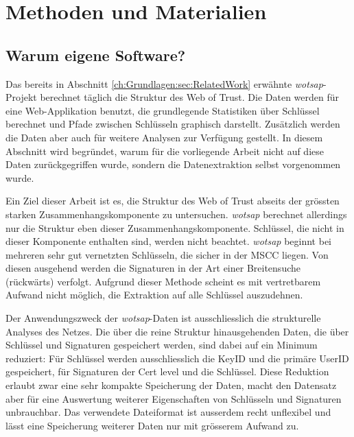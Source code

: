 
\chapter{Methoden und Materialien}
\label{ch:Methoden}

\section{Warum eigene Software?}
\label{ch:Grundlagen:sec:WarumEigene}
Das bereits in Abschnitt \ref{ch:Grundlagen:sec:RelatedWork} erwähnte
\emph{wotsap}-Projekt berechnet täglich die Struktur des Web of
Trust. Die Daten werden für eine Web-Applikation benutzt, die
grundlegende Statistiken über Schlüssel berechnet und Pfade zwischen
Schlüsseln graphisch darstellt. Zusätzlich werden die Daten aber auch
für weitere Analysen zur Verfügung gestellt. In diesem Abschnitt wird
begründet, warum für die vorliegende Arbeit nicht auf diese Daten
zurückgegriffen wurde, sondern die Datenextraktion selbst vorgenommen
wurde.

Ein Ziel dieser Arbeit ist es, die Struktur des Web of Trust abseits
der grössten starken Zusammenhangskomponente zu
untersuchen. \emph{wotsap} berechnet allerdings nur die Struktur eben
dieser Zusammenhangskomponente. Schlüssel, die nicht in dieser
Komponente enthalten sind, werden nicht beachtet. \emph{wotsap}
beginnt bei mehreren sehr gut vernetzten Schlüsseln, die sicher in der
MSCC liegen. Von diesen ausgehend werden die Signaturen in der Art
einer Breitensuche (rückwärts) verfolgt. Aufgrund dieser Methode
scheint es mit vertretbarem Aufwand nicht möglich, die Extraktion auf
alle Schlüssel auszudehnen.

Der Anwendungszweck der \emph{wotsap}-Daten ist ausschliesslich die
strukturelle Analyses des Netzes. Die über die reine Struktur
hinausgehenden Daten, die über Schlüssel und Signaturen gespeichert
werden, sind dabei auf ein Minimum reduziert: Für Schlüssel werden
ausschliesslich die KeyID und die primäre UserID gespeichert, für
Signaturen der Cert level und die Schlüssel. Diese Reduktion erlaubt
zwar eine sehr kompakte Speicherung der Daten, macht den Datensatz
aber für eine Auswertung weiterer Eigenschaften von Schlüsseln und
Signaturen unbrauchbar. Das verwendete Dateiformat ist ausserdem recht
unflexibel und lässt eine Speicherung weiterer Daten nur mit grösserem
Aufwand zu.

